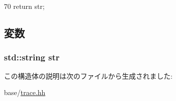 \begin{DoxyCode}
70 { return str; }
\end{DoxyCode}


\subsection{変数}
\hypertarget{structStringWrap_a5d55e2558544e2ad2ea0b54f8e3d41fc}{
\subsubsection[{str}]{\setlength{\rightskip}{0pt plus 5cm}std::string {\bf str}}}
\label{structStringWrap_a5d55e2558544e2ad2ea0b54f8e3d41fc}


この構造体の説明は次のファイルから生成されました:\begin{DoxyCompactItemize}
\item 
base/\hyperlink{trace_8hh}{trace.hh}\end{DoxyCompactItemize}
